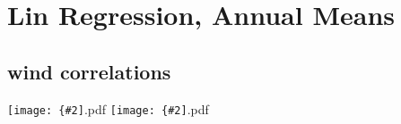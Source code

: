 \documentclass[12pt,a4paper]{article}
\newcommand{\pdffig}[2][0.5]{\texttt{[image: \{\#2]}.pdf}}
\begin{document}
\section{Lin Regression, Annual Means}
\subsection{wind correlations}


\pdffig[0.5]{Lin_Regression_Aus_tsfc_u_850.0.amip.ens1}
\pdffig[0.5]{Lin_Regression_Aus_tsfc_v_850.0.amip.ens1}
\end{document}
